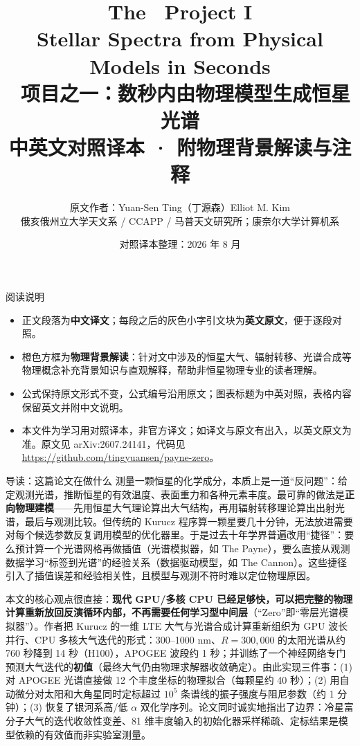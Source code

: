 \documentclass[11pt,a4paper,UTF8,fontset=fandol]{ctexart}
\title{\textbf{The \paynezero\ Project I\\Stellar Spectra from Physical Models in Seconds}\\[8pt]
\Large \paynezero\ 项目之一：数秒内由物理模型生成恒星光谱\\[6pt]
\large 中英文对照译本 · 附物理背景解读与注释}
\author{原文作者：Yuan-Sen Ting（丁源森）\quad Elliot M. Kim\\
俄亥俄州立大学天文系 / CCAPP / 马普天文研究所；康奈尔大学计算机系}
\date{对照译本整理：2026 年 8 月}
\begin{document}
\maketitle

\begin{notebox}{阅读说明}
\begin{itemize}
  \item 正文段落为\textbf{中文译文}；每段之后的灰色小字引文块为\textbf{英文原文}，便于逐段对照。
  \item 橙色方框为\textbf{物理背景解读}：针对文中涉及的恒星大气、辐射转移、光谱合成等物理概念补充背景知识与直观解释，帮助非恒星物理专业的读者理解。
  \item 公式保持原文形式不变，公式编号沿用原文；图表标题为中英对照，表格内容保留英文并附中文说明。
  \item 本文件为学习用对照译本，非官方译文；如译文与原文有出入，以英文原文为准。原文见 arXiv:2607.24141，代码见 \url{https://github.com/tingyuansen/payne-zero}。
\end{itemize}
\end{notebox}

\begin{notebox}{导读：这篇论文在做什么}
测量一颗恒星的化学成分，本质上是一道“反问题”：给定观测光谱，推断恒星的有效温度、表面重力和各种元素丰度。最可靠的做法是\textbf{正向物理建模}——先用恒星大气理论算出大气结构，再用辐射转移理论算出出射光谱，最后与观测比较。但传统的 Kurucz 程序算一颗星要几十分钟，无法放进需要对每个候选参数反复调用模型的优化器里。于是过去十年学界普遍改用“捷径”：要么预计算一个光谱网格再做插值（光谱模拟器，如 The Payne），要么直接从观测数据学习“标签到光谱”的经验关系（数据驱动模型，如 The Cannon）。这些捷径引入了插值误差和经验相关性，且模型与观测不符时难以定位物理原因。

本文的核心观点很直接：\textbf{现代 GPU/多核 CPU 已经足够快，可以把完整的物理计算重新放回反演循环内部，不再需要任何学习型中间层}（“Zero”即“零层光谱模拟器”）。作者把 Kurucz 的一维 LTE 大气与光谱合成计算重新组织为 GPU 波长并行、CPU 多核大气迭代的形式：300--1000 nm、$R=300{,}000$ 的太阳光谱从约 760 秒降到 14 秒（H100），APOGEE 波段约 1 秒；并训练了一个神经网络专门预测大气迭代的\textbf{初值}（最终大气仍由物理求解器收敛确定）。由此实现三件事：(1) 对 APOGEE 光谱直接做 12 个丰度坐标的物理拟合（每颗星约 40 秒）；(2) 用自动微分对太阳和大角星同时定标超过 $10^5$ 条谱线的振子强度与阻尼参数（约 1 分钟）；(3) 恢复了银河系高/低 $\alpha$ 双化学序列。论文同时诚实地指出了边界：冷星富分子大气的迭代收敛性变差、81 维丰度输入的初始化器采样稀疏、定标结果是模型依赖的有效值而非实验室测量。
\end{notebox}
\end{document}
